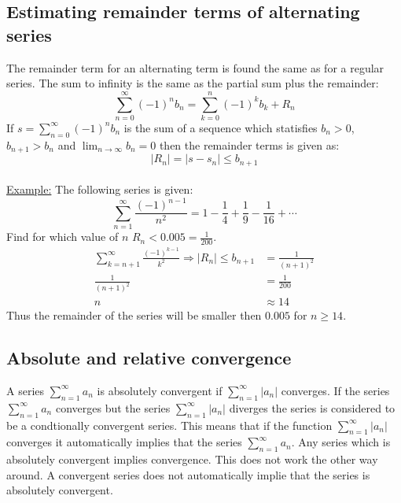 \documentclass[11pt, a4paper]{article}
\numberwithin{equation}{section}
\numberwithin{figure}{section}
\begin{document}
\subsection{Estimating remainder terms of alternating series}
The remainder term for an alternating term is found the same as for a regular series. The sum to infinity is the same as the partial sum plus the remainder:
\begin{equation}
  \sum_{n=0}^\infty (-1)^n b_n = \sum_{k=0}^n (-1)^k b_k + R_n
\end{equation}
If $s=\sum_{n=0}^\infty (-1)^n b_n$ is the sum of a sequence which statisfies $b_n > 0$, $b_{n+1} > b_n$ and $\lim_{n\to\infty} b_n = 0$ then the remainder terms is given as:
\begin{equation}
  |R_n| = |s-s_n| \leq b_{n+1}
\end{equation}
\\
\newline\underline{Example:} The following series is given:
\begin{equation*}
  \sum_{n=1}^\infty \frac{(-1)^{n-1}}{n^2} = 1 - \frac{1}{4} + \frac{1}{9} - \frac{1}{16} + \cdots
\end{equation*}
Find for which value of $n$ $R_n < 0.005 = \frac{1}{200}$.
\begin{align*}
  \sum_{k=n+1}^{\infty} \frac{(-1)^{k-1}}{k^2} \Rightarrow |R_n| \leq b_{n+1} &= \frac{1}{(n+1)^2}\\
  \frac{1}{(n+1)^2} &= \frac{1}{200}\\
  n &\approx 14
\end{align*}
Thus the remainder of the series will be smaller then $0.005$ for $n \geq 14$.


\subsection{Absolute and relative convergence}
A series $\sum_{n=1}^\infty a_n$ is absolutely convergent if $\sum_{n=1}^\infty |a_n|$ converges. If the series $\sum_{n=1}^\infty a_n$ converges but the series $\sum_{n=1}^\infty |a_n|$ diverges the series is considered to be a condtionally convergent series.
This means that if the function $\sum_{n=1}^\infty |a_n|$ converges it automatically implies that the series $\sum_{n=1}^\infty a_n$. Any series which is absolutely convergent implies convergence. This does not work the other way around. A convergent series does not automatically implie that the series is absolutely convergent.
\end{document}
